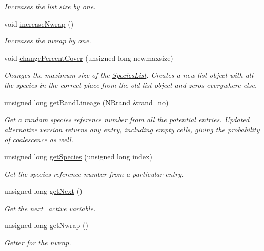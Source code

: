 \begin{DoxyCompactItemize}
\begin{DoxyCompactList}\small\item\em Increases the list size by one. \end{DoxyCompactList}\item 
void \hyperlink{class_species_list_aa9e64b4e922b43c17e188ca2038cb18a}{increase\+Nwrap} ()
\begin{DoxyCompactList}\small\item\em Increases the nwrap by one. \end{DoxyCompactList}\item 
void \hyperlink{class_species_list_a40206bc9836f394653997a61c1c8617a}{change\+Percent\+Cover} (unsigned long newmaxsize)
\begin{DoxyCompactList}\small\item\em Changes the maximum size of the \hyperlink{class_species_list}{Species\+List}. Creates a new list object with all the species in the correct place from the old list object and zeros everywhere else. \end{DoxyCompactList}\item 
unsigned long \hyperlink{class_species_list_a8e57aa257510bf61680e53c548fd4610}{get\+Rand\+Lineage} (\hyperlink{class_n_rrand}{N\+Rrand} \&rand\+\_\+no)
\begin{DoxyCompactList}\small\item\em Get a random species reference number from all the potential entries. Updated alternative version returns any entry, including empty cells, giving the probability of coalescence as well. \end{DoxyCompactList}\item 
unsigned long \hyperlink{class_species_list_ab215c2790feb1a721c759bbb1c434f85}{get\+Species} (unsigned long index)
\begin{DoxyCompactList}\small\item\em Get the species reference number from a particular entry. \end{DoxyCompactList}\item 
unsigned long \hyperlink{class_species_list_ac3fffc2d47557af6964cb25336d0e5cc}{get\+Next} ()
\begin{DoxyCompactList}\small\item\em Get the next\+\_\+active variable. \end{DoxyCompactList}\item 
unsigned long \hyperlink{class_species_list_a9cd0acb0d22d6b14c4d58668cdb36af3}{get\+Nwrap} ()
\begin{DoxyCompactList}\small\item\em Getter for the nwrap. \end{DoxyCompactList}\item 

\end{DoxyCompactItemize}
